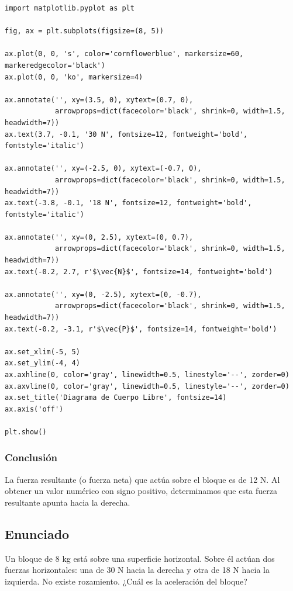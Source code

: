 \documentclass[12pt]{article}
\begin{document}
\begin{lstlisting}
import matplotlib.pyplot as plt

fig, ax = plt.subplots(figsize=(8, 5))

ax.plot(0, 0, 's', color='cornflowerblue', markersize=60, markeredgecolor='black')
ax.plot(0, 0, 'ko', markersize=4) 

ax.annotate('', xy=(3.5, 0), xytext=(0.7, 0), 
            arrowprops=dict(facecolor='black', shrink=0, width=1.5, headwidth=7))
ax.text(3.7, -0.1, '30 N', fontsize=12, fontweight='bold', fontstyle='italic')

ax.annotate('', xy=(-2.5, 0), xytext=(-0.7, 0), 
            arrowprops=dict(facecolor='black', shrink=0, width=1.5, headwidth=7))
ax.text(-3.8, -0.1, '18 N', fontsize=12, fontweight='bold', fontstyle='italic')

ax.annotate('', xy=(0, 2.5), xytext=(0, 0.7), 
            arrowprops=dict(facecolor='black', shrink=0, width=1.5, headwidth=7))
ax.text(-0.2, 2.7, r'$\vec{N}$', fontsize=14, fontweight='bold')

ax.annotate('', xy=(0, -2.5), xytext=(0, -0.7), 
            arrowprops=dict(facecolor='black', shrink=0, width=1.5, headwidth=7))
ax.text(-0.2, -3.1, r'$\vec{P}$', fontsize=14, fontweight='bold')

ax.set_xlim(-5, 5)
ax.set_ylim(-4, 4)
ax.axhline(0, color='gray', linewidth=0.5, linestyle='--', zorder=0)
ax.axvline(0, color='gray', linewidth=0.5, linestyle='--', zorder=0)
ax.set_title('Diagrama de Cuerpo Libre', fontsize=14)
ax.axis('off')

plt.show()
\end{lstlisting}

\subsubsection*{Conclusión}
La fuerza resultante (o fuerza neta) que actúa sobre el bloque es de 12 N. Al obtener un valor numérico con signo positivo, determinamos que esta fuerza resultante apunta hacia la derecha.

\newpage

\subsection*{Enunciado}
Un bloque de 8 kg está sobre una superficie horizontal. Sobre él actúan dos fuerzas horizontales: una de 30 N hacia la derecha y otra de 18 N hacia la izquierda. No existe rozamiento. ¿Cuál es la aceleración del bloque?
\end{document}
